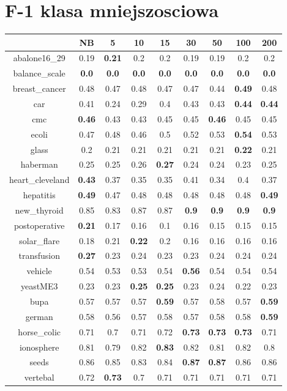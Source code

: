 \documentclass{article}%
\begin{document}
%
\section*{F{-}1 klasa mniejszosciowa}%
\begin{tabular}{c|cccccccc}%
\hline%
&NB&5&10&15&30&50&100&200\\%
\hline%
abalone16\_29&0.19&\textbf{0.21}&0.2&0.2&0.19&0.19&0.2&0.2\\%
\hline%
balance\_scale&\textbf{0.0}&\textbf{0.0}&\textbf{0.0}&\textbf{0.0}&\textbf{0.0}&\textbf{0.0}&\textbf{0.0}&\textbf{0.0}\\%
\hline%
breast\_cancer&0.48&0.47&0.48&0.47&0.47&0.44&\textbf{0.49}&0.48\\%
\hline%
car&0.41&0.24&0.29&0.4&0.43&0.43&\textbf{0.44}&\textbf{0.44}\\%
\hline%
cmc&\textbf{0.46}&0.43&0.43&0.45&0.45&\textbf{0.46}&0.45&0.45\\%
\hline%
ecoli&0.47&0.48&0.46&0.5&0.52&0.53&\textbf{0.54}&0.53\\%
\hline%
glass&0.2&0.21&0.21&0.21&0.21&0.21&\textbf{0.22}&0.21\\%
\hline%
haberman&0.25&0.25&0.26&\textbf{0.27}&0.24&0.24&0.23&0.25\\%
\hline%
heart\_cleveland&\textbf{0.43}&0.37&0.35&0.35&0.41&0.34&0.4&0.37\\%
\hline%
hepatitis&\textbf{0.49}&0.47&0.48&0.48&0.48&0.48&0.48&\textbf{0.49}\\%
\hline%
new\_thyroid&0.85&0.83&0.87&0.87&\textbf{0.9}&\textbf{0.9}&\textbf{0.9}&\textbf{0.9}\\%
\hline%
postoperative&\textbf{0.21}&0.17&0.16&0.1&0.16&0.15&0.15&0.15\\%
\hline%
solar\_flare&0.18&0.21&\textbf{0.22}&0.2&0.16&0.16&0.16&0.16\\%
\hline%
transfusion&\textbf{0.27}&0.23&0.24&0.23&0.23&0.24&0.24&0.24\\%
\hline%
vehicle&0.54&0.53&0.53&0.54&\textbf{0.56}&0.54&0.54&0.54\\%
\hline%
yeastME3&0.23&0.23&\textbf{0.25}&\textbf{0.25}&0.23&0.24&0.22&0.23\\%
\hline%
bupa&0.57&0.57&0.57&\textbf{0.59}&0.57&0.58&0.57&\textbf{0.59}\\%
\hline%
german&0.58&0.56&0.57&0.58&0.57&0.58&0.58&\textbf{0.59}\\%
\hline%
horse\_colic&0.71&0.7&0.71&0.72&\textbf{0.73}&\textbf{0.73}&\textbf{0.73}&0.71\\%
\hline%
ionosphere&0.81&0.79&0.82&\textbf{0.83}&0.82&0.81&0.82&0.8\\%
\hline%
seeds&0.86&0.85&0.83&0.84&\textbf{0.87}&\textbf{0.87}&0.86&0.86\\%
\hline%
vertebal&0.72&\textbf{0.73}&0.7&0.71&0.71&0.71&0.71&0.71\\%
\hline%
\end{tabular}
\end{document}
